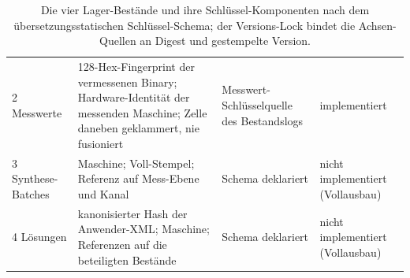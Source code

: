 \begin{nurlang}
\begin{table}[htbp]
\begin{tabular}{@{}lp{6.2cm}p{3.0cm}p{2.6cm}@{}}
2 Messwerte & 128-Hex-Fingerprint der vermessenen Binary; Hardware-Identität der messenden Maschine; Zelle daneben geklammert, nie fusioniert & Messwert-Schlüsselquelle des Bestandslogs & implementiert \\
3 Synthese-Batches & Maschine; Voll-Stempel; Referenz auf Mess-Ebene und Kanal & Schema deklariert & nicht implementiert (Vollausbau) \\
4 Lösungen & kanonisierter Hash der Anwender-XML\@; Maschine; Referenzen auf die beteiligten Bestände & Schema deklariert & nicht implementiert (Vollausbau) \\
\bottomrule
\end{tabular}
\caption{Die vier Lager-Bestände und ihre Schlüssel-Komponenten nach dem übersetzungsstatischen
Schlüssel-Schema; der Versions-Lock bindet die Achsen-Quellen an Digest und gestempelte
Version.}\label{tab:lager-schluessel}
\end{table}
\end{nurlang}
